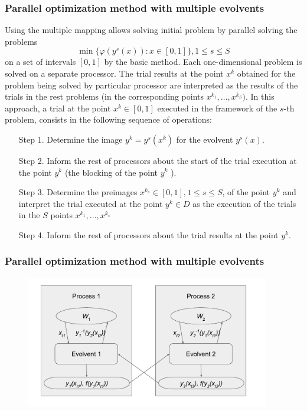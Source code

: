 \documentclass[aspectratio=1610]{beamer}
\begin{document}
\begin{frame}
  \frametitle{Parallel optimization method with multiple evolvents}
  Using the multiple mapping allows solving initial problem by parallel solving the problems
  \[
  \min\{\varphi(y^s(x)):x\in [0,1]\}, 1\leqslant s\leqslant S
  \]
  on a set of intervals $[0,1]$ by the basic method. Each one-dimensional problem is solved on a
  separate processor. The trial results at the point \(x^k\) obtained for the problem being solved by
  particular processor are interpreted as the results of the trials in the rest problems (in the
  corresponding points \(x^{k_1},\dots,x^{k_S})\). In this approach, a trial at the point \(x^k \in
  [0,1]\) executed in the framework of the \(s\)-th problem, consists in the following sequence of
  operations:
  \begin{enumerate}
    \setlength{\itemindent}{.1in}
    \item[Step 1.] Determine the image \(y^k=y^s (x^k)\) for the evolvent \(y^s (x)\).
    \item[Step 2.] Inform the rest of processors about the start of the trial execution at the point \( y^k\) (the
    blocking of the point \(y^k\) ).
    \item[Step 3.] Determine the preimages \(x{}^{k_s}  \in [0,1], 1\leqslant s\leqslant S\), of the point \(y^k\) and interpret the
    trial executed at the point \(y^k \in D \) as the execution of the trials in the \(S\) points
    \(x{}^{k_1} ,\dots,x{}^{k_s} \)
    \item[Step 4.] Inform the rest of processors about the trial results at the point \(y^k\).
  \end{enumerate}
\end{frame}

\begin{frame}
  \frametitle{Parallel optimization method with multiple evolvents}
  \begin{figure}[ht]
    \includegraphics[width=0.95\textwidth]{evolvents_parallel.pdf}
  \end{figure}
\end{frame}
\end{document}
